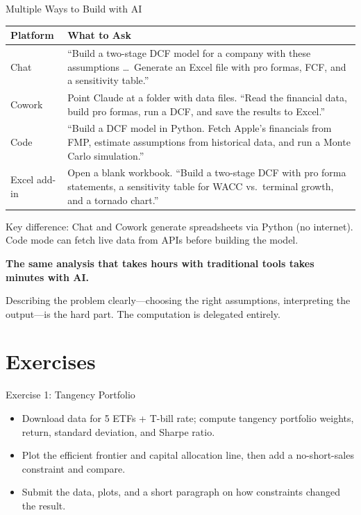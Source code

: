 \documentclass[aspectratio=169]{beamer}
\begin{document}
\begin{frame}[shrink=5]{Multiple Ways to Build with AI}
\begin{center}
\small
\begin{tabular}{@{} l p{9.5cm} @{}}
\toprule
\textbf{Platform} & \textbf{What to Ask} \\
\midrule
Chat & ``Build a two-stage DCF model for a company with these assumptions \ldots\ Generate an Excel file with pro formas, FCF, and a sensitivity table.'' \\
Cowork & Point Claude at a folder with data files. ``Read the financial data, build pro formas, run a DCF, and save the results to Excel.'' \\
Code & ``Build a DCF model in Python.  Fetch Apple's financials from FMP, estimate assumptions from historical data, and run a Monte Carlo simulation.'' \\
Excel add-in & Open a blank workbook.  ``Build a two-stage DCF with pro forma statements, a sensitivity table for WACC vs.\ terminal growth, and a tornado chart.'' \\
\bottomrule
\end{tabular}
\end{center}
\vspace{0.2cm}
\alert{Key difference:} Chat and Cowork generate spreadsheets via Python (no internet).  Code mode can \alert{fetch live data} from APIs before building the model.
\end{frame}

\begin{frame}{}
\vspace{2cm}
\begin{center}
{\Large\bfseries The same analysis that takes hours with traditional tools takes minutes with AI.}

\vspace{1cm}
Describing the problem clearly---choosing the right assumptions, interpreting the output---is the hard part.  The computation is delegated entirely.
\end{center}
\end{frame}

\section{Exercises}

\begin{frame}{Exercise 1: Tangency Portfolio}
\begin{itemize}
  \item Download data for 5 ETFs + T-bill rate; compute tangency portfolio weights, return, standard deviation, and Sharpe ratio.
  \item Plot the efficient frontier and capital allocation line, then add a no-short-sales constraint and compare.
  \item Submit the data, plots, and a short paragraph on how constraints changed the result.
\end{itemize}
\end{frame}
\end{document}

